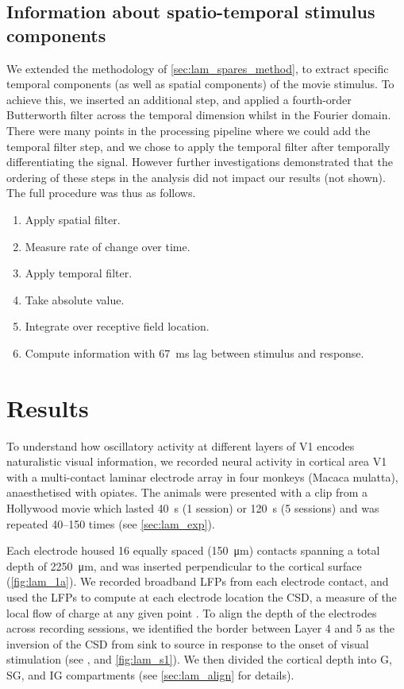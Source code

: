 \subsection{Information about spatio-temporal stimulus components}
\label{sec:lam_tmf_method}

We extended the methodology of \autoref{sec:lam_spares_method}, to extract specific temporal components (as well as spatial components) of the movie stimulus.
To achieve this, we inserted an additional step, and applied a fourth-order Butterworth filter across the temporal dimension whilst in the Fourier domain.
There were many points in the processing pipeline where we could add the temporal filter step, and we chose to apply the temporal filter after temporally differentiating the signal.
However further investigations demonstrated that the ordering of these steps in the analysis did not impact our results (not shown).
The full procedure was thus as follows.
\begin{enumerate}
\item Apply spatial filter.
\item Measure rate of change over time.
\item Apply temporal filter.
\item Take absolute value.
\item Integrate over receptive field location.
\item Compute information with \SI{67}{\milli\second} lag between stimulus and response.
\end{enumerate}


\section{Results}

To understand how oscillatory activity at different layers of \acf{V1} encodes naturalistic visual information, we recorded neural activity in cortical area \acs{V1} with a multi-contact laminar electrode array in four monkeys (Macaca mulatta), anaesthetised with opiates.
The animals were presented with a clip from a Hollywood movie which lasted \SI{40}{\second} (\num{1} session) or \SI{120}{\second} (\num{5} sessions) and was repeated \numrange{40}{150} times (see \autoref{sec:lam_exp}).

Each electrode housed \num{16} equally spaced (\SI{150}{\micro\metre}) contacts spanning a total depth of \SI{2250}{\micro\metre}, and was inserted perpendicular to the cortical surface (\autoref{fig:lam_1a}).
We recorded broadband \acp{LFP} from each electrode contact, and used the \acp{LFP} to compute at each electrode location the \ac{CSD}, a measure of the local flow of charge at any given point \citep{Einevoll2013}.
To align the depth of the electrodes across recording sessions, we identified the border between Layer 4 and 5 as the inversion of the \ac{CSD} from sink to source in response to the onset of visual stimulation (see \citealp{Schroeder1991}, and \autoref{fig:lam_s1}).
We then divided the cortical depth into \acf{G}, \acf{SG}, and \acf{IG} compartments (see \autoref{sec:lam_align} for details).

